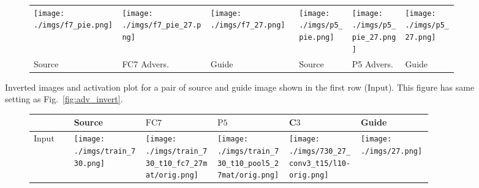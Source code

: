 \documentclass{article} %
\begin{document}
\begin{figure*}[h!]
\begin{subfigure}[t]{\linewidth}{
\centering
\renewcommand{\arraystretch}{1}
\setlength\tabcolsep{.1pt}
\begin{tabular}{
|>{\centering\arraybackslash}m{0.205\linewidth}
>{\centering\arraybackslash}m{0.205\linewidth}
>{\centering\arraybackslash}m{0.205\linewidth}|
>{\centering\arraybackslash}m{0.125\linewidth}
>{\centering\arraybackslash}m{0.125\linewidth}
>{\centering\arraybackslash}m{0.125\linewidth}|
}
\hline
\texttt{[image: ./imgs/f7\_pie.png]} &
\texttt{[image: ./imgs/f7\_pie\_27.png]} &
\texttt{[image: ./imgs/f7\_27.png]} &
\texttt{[image: ./imgs/p5\_pie.png]} &
\texttt{[image: ./imgs/p5\_pie\_27.png]} &
\texttt{[image: ./imgs/p5\_27.png]}\\
Source & FC7 Advers. & Guide & Source & P5 Advers. & Guide \\ \hline
\end{tabular}
}
\end{subfigure}
\caption{
    Inverted images and activation plot for a pair of source and guide image
    shown in the first row (Input). This figure has same setting as
    Fig.~\ref{fig:adv_invert}.
}
\label{fig:adv_invert4}
\end{figure*}\begin{figure}[h!]
    \centering
\begin{subfigure}[t]{\linewidth}{
\renewcommand{\arraystretch}{1}
\setlength\tabcolsep{2pt}
\begin{tabular}{|
>{\centering\arraybackslash}m{0.09\linewidth} |
>{\centering\arraybackslash}m{0.167\linewidth} |
>{\centering\arraybackslash}m{0.167\linewidth}
>{\centering\arraybackslash}m{0.167\linewidth}
>{\centering\arraybackslash}m{0.167\linewidth} |
>{\centering\arraybackslash}m{0.167\linewidth} | }
\hline
& Source & $\text{FC}7$ & $\text{P}5$ & C$3$ &Guide  \\\hline Input
& \texttt{[image: ./imgs/train\_730.png]}
& \texttt{[image: ./imgs/train\_730\_t10\_fc7\_27mat/orig.png]}
&
\texttt{[image: ./imgs/train\_730\_t10\_pool5\_27mat/orig.png]} &
\texttt{[image: ./imgs/730\_27\_conv3\_t15/l10-orig.png]} &
\texttt{[image: ./imgs/27.png]} \\

\end{tabular}}
\end{subfigure}
\end{figure}
\end{document}
